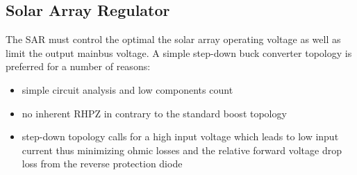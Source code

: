 \subsection{Solar Array Regulator}
The \ac{SAR} must control the optimal the solar array operating voltage as well as limit the output mainbus voltage. A simple step-down buck converter topology is preferred for a number of reasons:
%
\begin{itemize}
\item simple circuit analysis and low components count
\item no inherent \ac{RHPZ} in contrary to the standard boost topology
\item step-down topology calls for a high input voltage which leads to low input current thus minimizing ohmic losses and the relative forward voltage drop loss from the reverse protection diode
\end{itemize}
%
